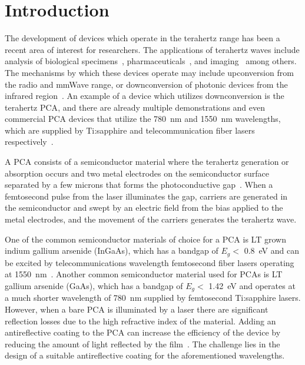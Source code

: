 \chapter{Introduction}\label{cha: introduction}
The development of devices which operate in the terahertz range has been a recent area of interest for researchers. The applications of terahertz waves include analysis of biological specimens~\cite{yuMedicalApplicationTerahertz2019}, pharmaceuticals~\cite{dohiApplicationTerahertzPulse2016}, and imaging~\cite{petrovApplicationTerahertzPulse2016} among others. The mechanisms by which these devices operate may include upconversion from the radio and mmWave range, or downconversion of photonic devices from the infrared region~\cite{songReviewIntenseTerahertz2026}. An example of a device which utilizes downconversion is the terahertz \gls{PCA}, and there are already multiple demonstrations and even commercial \gls{PCA} devices that utilize the \qty{780}{\nano\meter} and \qty{1550}{\nano\meter} wavelengths, which are supplied by Ti:sapphire and telecommunication fiber lasers respectively~\cite{yangSimpleReliableOptical2019, PCAPhotoconductiveAntenna}. 

A \gls{PCA} consists of a semiconductor material where the terahertz generation or absorption occurs and two metal electrodes on the semiconductor surface separated by a few microns that forms the photoconductive gap~\cite{songHandbookTerahertzTechnologies2015}. When a femtosecond pulse from the laser illuminates the gap, carriers are generated in the semiconductor and swept by an electric field from the bias applied to the metal electrodes, and the movement of the carriers generates the terahertz wave.  

One of the common semiconductor materials of choice for a \gls{PCA} is \gls{LT} grown indium gallium arsenide (InGaAs), which has a bandgap of $E_{g}<$ \qty{0.8}{\electronvolt} and can be excited by telecommunications wavelength femtosecond fiber lasers operating at \qty{1550}{\nano\meter}~\cite{burfordReviewTerahertzPhotoconductive2017}. Another common semiconductor material used for \gls{PCA}s is \gls{LT} gallium arsenide (GaAs), which has a bandgap of $E_{g}<$ \qty{1.42}{\electronvolt} and operates at a much shorter wavelength of \qty{780}{nm}\cite{delarosaTerahertzEmissionImprovement2024} supplied by femtosecond Ti:sapphire lasers. However, when a bare PCA is illuminated by a laser there are significant reflection losses due to the high refractive index of the material\cite{riturajHighlySensitiveEfficient2025}. Adding an antireflective coating to the PCA can increase the efficiency of the device by reducing the amount of light reflected by the film~\cite{jiangTerahertzPhotoconductiveAntenna2021}. The challenge lies in the design of a suitable antireflective coating for the aforementioned wavelengths.

